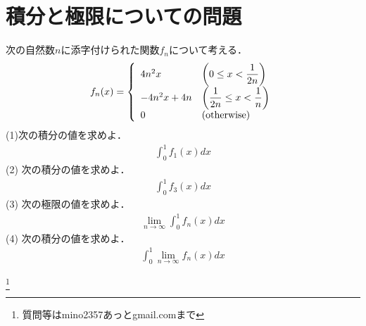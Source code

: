 \documentclass[12pt]{jarticle}
\date{}
\begin{document}

\section*{積分と極限についての問題}

次の自然数$n$に添字付けられた関数$f_n$について考える．
\begin{align*}
  f_{n}(x) =
\left\{ \begin{array}{ll}
4n^{2}x & \left(0 \le x < \dfrac{1}{2n}\right) \\
-4n^{2}x + 4n & \left(\dfrac{1}{2n} \le x < \dfrac{1}{n}\right) \\
0 & \left(\rm{otherwise}\right) \\
\end{array} \right.
\end{align*}
(1)次の積分の値を求めよ．
\begin{align*}
\int_{0}^{1} f_{1}(x) dx
\end{align*}
(2) 次の積分の値を求めよ．
\begin{align*}
\int_{0}^{1} f_{3}(x) dx
\end{align*}
(3) 次の極限の値を求めよ．
\begin{align*}
\lim_{n \to \infty} \int_{0}^{1} f_{n}(x) dx
\end{align*}
(4) 次の積分の値を求めよ．
\begin{align*}
\int_{0}^{1} \lim_{n \to \infty} f_{n}(x) dx
\end{align*}

\footnote[0]{
質問等はmino2357あっとgmail.comまで
}

\thispagestyle{empty}
\end{document}
